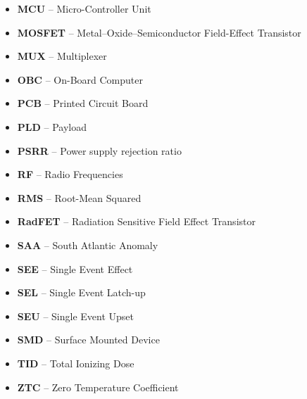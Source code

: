 \begin{itemize}
    \item    \textbf{MCU}      --    Micro-Controller Unit
    \item    \textbf{MOSFET}   --    Metal–Oxide–Semiconductor Field-Effect Transistor 
    \item    \textbf{MUX}      --    Multiplexer
    \item    \textbf{OBC}      --    On-Board Computer
    \item    \textbf{PCB}      --    Printed Circuit Board
    \item    \textbf{PLD}      --    Payload
    \item    \textbf{PSRR}     --    Power supply rejection ratio
    \item    \textbf{RF}       --    Radio Frequencies
    \item    \textbf{RMS}      --    Root-Mean Squared
    \item    \textbf{RadFET}   --    Radiation Sensitive Field Effect Transistor
    \item    \textbf{SAA}      --    South Atlantic Anomaly
    \item    \textbf{SEE}      --    Single Event Effect
    \item    \textbf{SEL}      --    Single Event Latch-up
    \item    \textbf{SEU}      --    Single Event Upset
    \item    \textbf{SMD}      --    Surface Mounted Device
    \item    \textbf{TID}      --    Total Ionizing Dose
    \item    \textbf{ZTC}      --    Zero    Temperature    Coefficient
\end{itemize}
